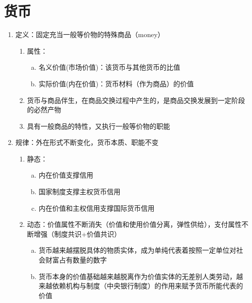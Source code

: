 \documentclass[12pt]{book}
\begin{document}
\chapter{货币}




\begin{enumerate}[1.]
    \item 定义：固定充当一般等价物的特殊商品（money）
    \begin{enumerate}[(1)]
        \item 属性：
        \begin{enumerate}[a.]
            \item 名义价值(市场价值)：该货币与其他货币的比值
            \item 实际价值(内在价值)：货币材料（作为商品）的价值
        \end{enumerate}
        \item 货币与商品伴生，在商品交换过程中产生的，是商品交换发展到一定阶段的必然产物
        \item 具有一般商品的特性，又执行一般等价物的职能
    \end{enumerate}
    \item 规律：外在形式不断变化，货币本质、职能不变
    \begin{enumerate}[(1)]
        \item 静态：
        \begin{enumerate}[a.]
            \item 内在价值支撑信用
            \item 国家制度支撑主权货币信用
            \item 内在价值和主权信用支撑国际货币信用
        \end{enumerate}

        \item 动态：价值属性不断消失（价值和使用价值分离，弹性供给），支付属性不断增强（制度共识+价值共识）
        \begin{enumerate}[a.]
        \item 货币越来越摆脱具体的物质实体，成为单纯代表着按照一定单位对社会财富占有数量的数字
           \item 货币本身的价值基础越来越脱离作为价值实体的无差别人类劳动，越来越依赖机构与制度（中央银行制度）的作用来赋予货币所能代表的价值
        \end{enumerate}
    \end{enumerate}
   
\end{enumerate}
\end{document}
